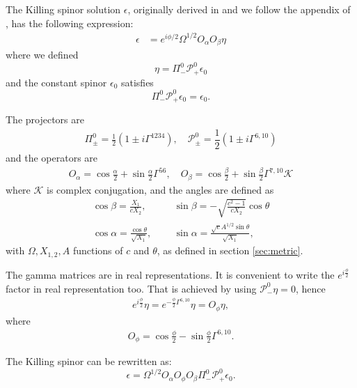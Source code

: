 
The Killing spinor solution $\epsilon$, originally derived in \cite{Pilch:2003jg} and we follow the appendix of \cite{Chen-Lin:2015xlh}, has the following expression:
\begin{align}
\epsilon &= e^{i\phi/2}\Omega^{1/2} O_\alpha O_\beta \eta
\end{align}
where we defined
\begin{equation}
\eta = \Pi_{-}^0 \mathcal{P}_+^{0} \epsilon_0
\end{equation}
and the constant spinor $\epsilon_0$ satisfies
\begin{equation}
 \Pi^0_- \mathcal{P}_+^{0} \epsilon_0 = \epsilon_0.
\end{equation}

The projectors are
\begin{align}
\Pi_\pm^0 = 
\frac{1}{2}\left(1 \pm i\Gamma^{1234}\right), 
\quad
\mathcal{P}_{\pm}^{0} =
\dfrac{1}{2} \left(1\pm i\Gamma^{6,10}\right)
\end{align}
and the operators are
\begin{align}
O_\alpha = \cos\frac{\alpha}{2} + \sin\frac{\alpha}{2}\Gamma^{5 6},
\quad
O_\beta = \cos\frac{\beta}{2} + \sin\frac{\beta}{2}\Gamma^{7, 10}\mathcal{K}
\end{align}
where $\mathcal{K}$ is complex conjugation, and the angles are defined as
\begin{align}
\cos\beta = \frac{X_1}{c X_2}, \quad 
&\quad
\sin\beta = -\sqrt{\frac{c^2 - 1}{c X_2}}\cos\theta\\
%
\cos\alpha = \frac{\cos\theta}{\sqrt{X_1}}, 
&\quad
\sin\alpha = \frac{\sqrt{c}A^{1/2}\sin\theta}{\sqrt{X_1}},
\end{align}
with $\Omega, X_{1,2}, A$ functions of $c$ and $\theta$, as defined in section \ref{sec:metric}. 


The gamma matrices are in real representations. It is convenient to write the $e^{i \frac{\phi}{2}}$ factor in real representation too. 
That is achieved by using $\mathcal{P}_-^0 \eta = 0 $, hence
\begin{align}
 e^{i \frac{\phi}{2}} \eta 
    = e^{-\frac{\phi}{2}\Gamma^{6,10}} \eta
    = O_\phi \eta,
\end{align}
where 
\begin{align}
 O_\phi = \cos\frac{\phi}{2} - \sin\frac{\phi}{2}\Gamma^{6, 10}.
\end{align}

The Killing spinor can be rewritten as:
\begin{equation}\label{eq:KillingSpinor}
 \epsilon = \Omega^{1/2} O_\alpha O_\phi O_\beta \Pi_{-}^0 \mathcal{P}_+^{0} \epsilon_0.
\end{equation}




